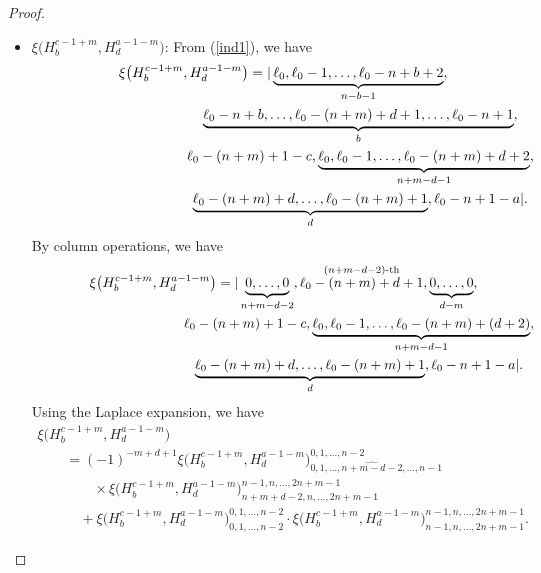 \documentclass[pdftex]{sigma}
\numberwithin{equation}{section}
\begin{document}
\begin{proof}
\begin{itemize}
\item $\xi\bigl(H^{c-1+m}_{b}, H^{a-1-m}_{d}\bigr)$: From (\ref{ind1}), we have
\begin{gather*}
\xi\bigl(H^{c-1+m}_{b}, H^{a-1-m}_{d}\bigr)=|\underbrace{\ell_{0},\ell_{0}-1,\dots,\ell_{0}-n+b+2}_{n-b-1},\\
\hphantom{\xi\bigl(H^{c-1+m}_{b}, H^{a-1-m}_{d}\bigr)=|}{}
\underbrace{\ell_{0}-n+b,\dots,\ell_{0}-(n+m)+d+1,\dots,\ell_{0}-n+1}_{b},\nonumber\\
\hphantom{\xi\bigl(H^{c-1+m}_{b}, H^{a-1-m}_{d}\bigr)=|}{}
\,\ell_{0}-(n+m)+1-c,\underbrace{\ell_{0},\ell_{0}-1,\dots,\ell_{0}-(n+m)+d+2}_{n+m-d-1},\nonumber\\
\hphantom{\xi\bigl(H^{c-1+m}_{b}, H^{a-1-m}_{d}\bigr)=|}{}
\underbrace{\ell_{0}-(n+m)+d,\dots,\ell_{0}-(n+m)+1}_{d},\ell_{0}-n+1-a|.
\end{gather*}
By column operations, we have
\begin{gather*}
\xi\bigl(H^{c-1+m}_{b}, H^{a-1-m}_{d}\bigr)=|\underbrace{0,\dots,0}_{n+m-d-2},\stackrel{(n+m-d-2)\text{-th}}{\ell_{0}-(n+m)+d+1},\underbrace{0,\dots,0}_{d-m},\nonumber\\
\hphantom{\xi\bigl(H^{c-1+m}_{b}, H^{a-1-m}_{d}\bigr)=|}{}
\,\ell_{0}-(n+m)+1-c,\underbrace{\ell_{0},\ell_{0}-1,\dots,\ell_{0}-(n+m)+(d+2)}_{n+m-d-1},\nonumber\\
\hphantom{\xi\bigl(H^{c-1+m}_{b}, H^{a-1-m}_{d}\bigr)=|}{}
\underbrace{\ell_{0}-(n+m)+d,\dots,\ell_{0}-(n+m)+1}_{d},\ell_{0}-n+1-a|.
\end{gather*}
Using the Laplace expansion, we have
\begin{gather*}
\xi\bigl(H^{c-1+m}_{b}, H^{a-1-m}_{d}\bigr)\\
\qquad{}={(-1)}^{-m+d+1}\xi\bigl(H^{c-1+m}_{b}, H^{a-1-m}_{d}\bigr)^{0,1,\dots,n-2}_{0,1,\dots,\widehat{n+m-d-2},\dots,n-1}\\
\qquad\qquad{}\times
\xi\bigl(H^{c-1+m}_{b}, H^{a-1-m}_{d}\bigr)^{n-1,n,\dots,2n+m-1}_{n+m+d-2,n,\dots,2n+m-1}\\
\qquad\quad{}
+\xi\bigl(H^{c-1+m}_{b}, H^{a-1-m}_{d}\bigr)^{0,1,\dots,n-2}_{0,1,\dots,n-2}\cdot\xi\bigl(H^{c-1+m}_{b}, H^{a-1-m}_{d}\bigr)^{n-1,n,\dots,2n+m-1}_{n-1,n,\dots,2n+m-1}.
\end{gather*}



\end{itemize}
\end{proof}
\end{document}
